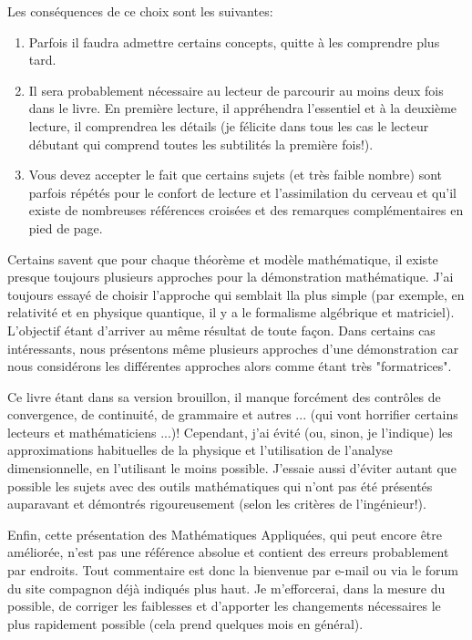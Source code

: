 	Les cons\'equences de ce choix sont les suivantes:
	\begin{enumerate}
		\item Parfois il faudra admettre certains concepts, quitte à les comprendre plus tard.
	
		\item Il sera probablement n\'ecessaire au lecteur de parcourir au moins deux fois dans le livre. En première lecture, il appr\'ehendra l'essentiel et à la deuxième lecture, il comprendrea les d\'etails (je f\'elicite dans tous les cas le lecteur d\'ebutant qui comprend toutes les subtilit\'es la première fois!).
	
		\item Vous devez accepter le fait que certains sujets (et très faible nombre) sont parfois r\'ep\'et\'es pour le confort de lecture et l'assimilation du cerveau et qu'il existe de nombreuses r\'ef\'erences crois\'ees et des remarques compl\'ementaires en pied de page.
	\end{enumerate}
	
	Certains savent que pour chaque th\'eorème et modèle math\'ematique, il existe presque toujours plusieurs approches pour la d\'emonstration math\'ematique. J'ai toujours essay\'e de choisir l'approche qui semblait lla plus simple (par exemple, en relativit\'e et en physique quantique, il y a le formalisme alg\'ebrique et matriciel). L'objectif \'etant d'arriver au même r\'esultat de toute façon. Dans certains cas int\'eressants, nous pr\'esentons même plusieurs approches d'une d\'emonstration car nous consid\'erons les diff\'erentes approches alors comme \'etant très "formatrices".
	
	Ce livre \'etant dans sa version brouillon, il manque forc\'ement des contrôles de convergence, de continuit\'e, de grammaire et autres ... (qui vont horrifier certains lecteurs et math\'ematiciens ...)! Cependant, j'ai \'evit\'e (ou, sinon, je l'indique) les approximations habituelles de la physique et l'utilisation de l'analyse dimensionnelle, en l'utilisant le moins possible. J'essaie aussi d'\'eviter autant que possible les sujets avec des outils math\'ematiques qui n'ont pas \'et\'e pr\'esent\'es auparavant et d\'emontr\'es rigoureusement (selon les critères de l'ing\'enieur!).
	
	Enfin, cette pr\'esentation des Math\'ematiques Appliqu\'ees, qui peut encore être am\'elior\'ee, n'est pas une r\'ef\'erence absolue et contient des erreurs probablement par endroits. Tout commentaire est donc la bienvenue par e-mail ou via le forum du site compagnon d\'ejà indiqu\'es plus haut. Je m'efforcerai, dans la mesure du possible, de corriger les faiblesses et d'apporter les changements n\'ecessaires le plus rapidement possible (cela prend quelques mois en g\'en\'eral).
	
